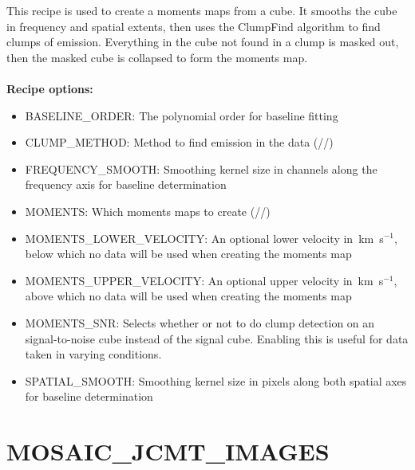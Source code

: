 \documentclass[11pt,oneside,chapters]{starlink}
\newcommand{\kms}{\mbox{$\,$km~s$^{-1}$}}   %
\newcommand{\kms}{\,km~s$^{-1}$}   %
\begin{document}
This recipe is used to create a moments maps from a cube. It smooths
the cube in frequency and spatial extents, then uses the ClumpFind
algorithm to find clumps of emission. Everything in the cube not found
in a clump is masked out, then the masked cube is collapsed to form
the moments map.
\\\\
\textbf{Recipe options:}
\begin{itemize}

\item BASELINE\_ORDER: The polynomial order for baseline fitting
\param{[1]}

\item CLUMP\_METHOD: Method to find emission in the data
(//) \param{[clumpfind]}

\item FREQUENCY\_SMOOTH: Smoothing kernel size in channels along the
frequency axis for baseline determination \param{[25]}

\item MOMENTS:  Which moments maps to create (//)
\param{[integ]}

\item MOMENTS\_LOWER\_VELOCITY: An optional lower velocity in \kms, below which
no data will be used when creating the moments map \param{[undef]}

\item MOMENTS\_UPPER\_VELOCITY: An optional upper velocity in \kms, above which
no data will be used when creating the moments map \param{[undef]}

\item MOMENTS\_SNR: Selects whether or not to do clump detection on an
signal-to-noise cube instead of the signal cube. Enabling this is
useful for data taken in varying conditions. \param{[0]}

\item SPATIAL\_SMOOTH: Smoothing kernel size in pixels along both
spatial axes for baseline determination \param{[3]}
\end{itemize}


\section{MOSAIC\_JCMT\_IMAGES}
\end{document}
